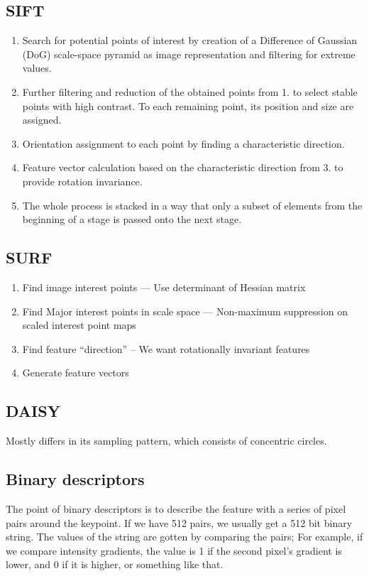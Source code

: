 \subsection{SIFT}
\begin{enumerate}
    \item 
Search for potential points of interest by creation of a
Difference of Gaussian (DoG) scale-space pyramid as image
representation and filtering for extreme values.

    \item
Further filtering and reduction of the obtained points from 1. to
select stable points with high contrast. To each remaining
point, its position and size are assigned.

    \item
Orientation assignment to each point by finding a characteristic
direction.

    \item
Feature vector calculation based on the characteristic direction
from 3. to provide rotation invariance.

    \item
The whole process is stacked in a way that only a subset of
elements from the beginning of a stage is passed onto the next
stage.

\end{enumerate}

\subsection{SURF}
\begin{enumerate}
    \item Find image interest points --- Use determinant of Hessian matrix
    \item Find Major interest points in scale space --- Non-maximum suppression
        on scaled interest point maps
    \item Find feature ``direction'' -- We want rotationally invariant features
    \item Generate feature vectors

\end{enumerate}

\subsection{DAISY}
Mostly differs in its sampling pattern, which consists of concentric circles.

\subsection{Binary descriptors}
The point of binary descriptors is to describe the feature with a series of
pixel pairs around the keypoint. If we have 512 pairs, we usually get a 512 bit
binary string. The values of the string are gotten by comparing the pairs; For
example, if we compare intensity gradients, the value is 1 if the second
pixel's gradient is lower, and 0 if it is higher, or something like that.

